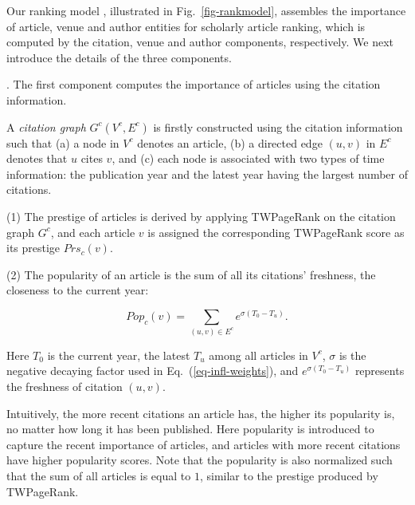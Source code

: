 Our ranking model \ensemblerank,  illustrated in Fig.~\ref{fig-rankmodel}, assembles the importance of article, venue and author entities for scholarly article ranking, which is computed by the citation, venue and author components, respectively.
%
We next introduce the details of the three components.


.
The first component computes the importance of articles using the citation information.

A {\em citation graph} $G^c(V^c, E^c)$ is firstly constructed using the citation information such that (a) a node in $V^c$ denotes an article, (b) a directed edge $(u,v)$ in $E^c$ denotes that $u$ cites $v$, and (c) each node is associated with two types of time information: the publication year and the latest year having the largest number of citations.


\sstab(1) The prestige of articles is derived by applying TWPageRank on the citation graph $G^c$, and each article $v$ is assigned the corresponding TWPageRank score as its prestige $Prs_c(v)$.

\sstab(2)  The popularity of an article is the sum of all its citations' freshness, \ie the closeness to the current year:

\vspace{-1ex}
\begin{small}
\begin{equation}\label{eq-pop}
Pop_c(v) = \sum_{{(u,v)\in E^c}} {e^{\sigma (T_0-T_u)}}.
\end{equation}
\end{small}
\noindent
Here $T_0$ is the current year, \ie the latest $T_u$ among all articles in $V^c$, $\sigma$ is the negative decaying factor used in Eq.~(\ref{eq-infl-weights}), and $e^{\sigma (T_0-T_u)}$ represents the freshness of citation $(u,v)$.


Intuitively, the more recent citations an article has, the higher its popularity is, no matter how long it has been published.
Here popularity is introduced to capture the recent importance of articles, and articles with more recent citations have higher popularity scores. %
%
%
Note that the popularity is also normalized such that the sum of  all articles is equal to $1$, similar to the prestige produced by TWPageRank.

